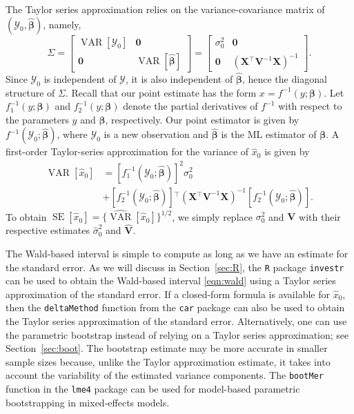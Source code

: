 \documentclass{article}\usepackage[]{graphicx}\usepackage[]{color}
\newcommand{\trans}{\ensuremath{^\top}}
\newcommand{\VAR}{\operatorname{VAR}}
\newcommand{\SE}{\operatorname{SE}}
\begin{document}
The Taylor series approximation relies on the variance-covariance matrix of $\left(\mathcal{Y}_0, \widehat{\bm{\beta}}\right)$, namely,
\[
\Sigma = \begin{bmatrix}
           \VAR\left[\mathcal{Y}_0\right] & \bm{0} \\
           \bm{0} & \VAR\left[\widehat{\bm{\beta}}\right]
         \end{bmatrix} = \begin{bmatrix}
           \sigma_0^2 & \bm{0} \\
           \bm{0} & \left(\bm{X}\trans\bm{V}^{-1}\bm{X}\right)^{-1}
         \end{bmatrix}.
\]
Since $\mathcal{Y}_0$ is independent of $\bm{\mathcal{Y}}$, it is also independent of $\widehat{\bm{\beta}}$, hence the diagonal structure of $\Sigma$. Recall that our point estimate has the form $x = f^{-1}\left(y; \bm{\beta}\right)$. Let $f_1^{-1}\left(y; \bm{\beta}\right)$ and $f_2^{-1}\left(y; \bm{\beta}\right)$ denote the partial derivatives of $f^{-1}$ with respect to the parameters $y$ and $\bm{\beta}$, respectively. Our point estimator is given by $f^{-1}\left(\mathcal{Y}_0; \widehat{\bm{\beta}}\right)$, where $\mathcal{Y}_0$ is a new observation and $\widehat{\bm{\beta}}$ is the ML estimator of $\bm{\beta}$.  A first-order Taylor-series approximation for the variance of $\widehat{x}_0$ is given by
\begin{align}
  \VAR\left[\widehat{x}_0\right] &= \left[f_1^{-1}\left(\mathcal{Y}_0; \widehat{\bm{\beta}}\right)\right]^2\sigma_0^2 \nonumber \\
   &+ \left[f_2^{-1}\left(\mathcal{Y}_0; \widehat{\bm{\beta}}\right)\right]\trans\left(\bm{X}\trans\bm{V}^{-1}\bm{X}\right)^{-1}\left[f_2^{-1}\left(\mathcal{Y}_0; \widehat{\bm{\beta}}\right)\right].
\end{align}
To obtain $\SE\left[\widehat{x}_0\right] = \Big\{ \widehat{\VAR}\left[\widehat{x}_0\right] \Big\}^{1/2}$, we simply replace $\sigma_0^2$ and $\bm{V}$ with their respective estimates $\widehat{\sigma}_0^2$ and $\widehat{\bm{V}}$.

The Wald-based interval is simple to compute as long as we have an estimate for the standard error. As we will discuss in Section~\ref{sec:R}, the \texttt{R} package \texttt{investr} \citep{investr-package} can be used to obtain the Wald-based interval \eqref{eqn:wald} using a Taylor series approximation of the standard error. If a closed-form formula is available for $\widehat{x}_0$, then the \texttt{deltaMethod} function from the \texttt{car} package \citep{fox-car-2011} can also be used to obtain the Taylor series approximation of the standard error. Alternatively, one can use the parametric bootstrap instead of relying on a Taylor series approximation; see Section~\ref{sec:boot}. The bootstrap estimate may be more accurate in smaller sample sizes because, unlike the Taylor approximation estimate, it takes into account the variability of the estimated variance components. The \texttt{bootMer} function in the \texttt{lme4} package \citep{bates-lme4-2014} can be used for model-based parametric bootstrapping in mixed-effects models.
\end{document}
